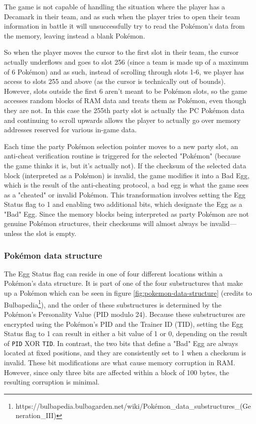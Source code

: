 \documentclass[a4paper]{usiinfbachelorproject}
\begin{document}
The game is not capable of handling the situation where the player has a Decamark in their team, and as such when the player tries to open their team information in battle it will unsuccessfully try to read the Pokémon's data from the memory, leaving instead a blank Pokémon.


So when the player moves the cursor to the first slot in their team, the cursor actually underflows and goes to slot 256  (since a team is made up of a maximum of 6 Pokémon) and as such, instead of scrolling through slots 1-6, we player has access to slots 255 and above (as the cursor is technically out of bounds). However, slots outside the first 6 aren't meant to be Pokémon slots, so the game accesses random blocks of RAM data and treats them as Pokémon, even though they are not. In this case the 255th party slot is actually the PC Pokémon data and continuing to scroll upwards allows the player to actually go over memory addresses reserved for various in-game data.

Each time the party Pokémon selection pointer moves to a new party slot, an anti-cheat verification routine is triggered for the selected "Pokémon" (because the game thinks it is, but it's actually not). If the checksum of the selected data block (interpreted as a Pokémon) is invalid, the game modifies it into a Bad Egg, which is the result of the anti-cheating protocol, a bad egg is what the game sees as a "cheated" or invalid Pokémon. This transformation involves setting the Egg Status flag to 1 and enabling two additional bits, which designate the Egg as a "Bad" Egg. Since the memory blocks being interpreted as party Pokémon are not genuine Pokémon structures, their checksums will almost always be invalid—unless the slot is empty.

\subsubsection{\textbf{Pokémon data structure}}
\label{sec:data_structure}
The Egg Status flag can reside in one of four different locations within a Pokémon's data structure. It is part of one of the four substructures that make up a Pokémon which can be seen in figure \ref{fig:pokemon-data-structure} (credits to Bulbapedia\footnote{https://bulbapedia.bulbagarden.net/wiki/Pokémon\_data\_substructures\_(Generation\_III)}), and the order of these substructures is determined by the Pokémon's Personality Value (PID modulo 24). Because these substructures are encrypted using the Pokémon’s PID and the Trainer ID (TID), setting the Egg Status flag to 1 can result in either a bit value of 1 or 0, depending on the result of \texttt{PID} XOR \texttt{TID}. In contrast, the two bits that define a "Bad" Egg are always located at fixed positions, and they are consistently set to 1 when a checksum is invalid. These bit modifications are what cause memory corruption in RAM. However, since only three bits are affected within a block of 100 bytes, the resulting corruption is minimal.
\end{document}
